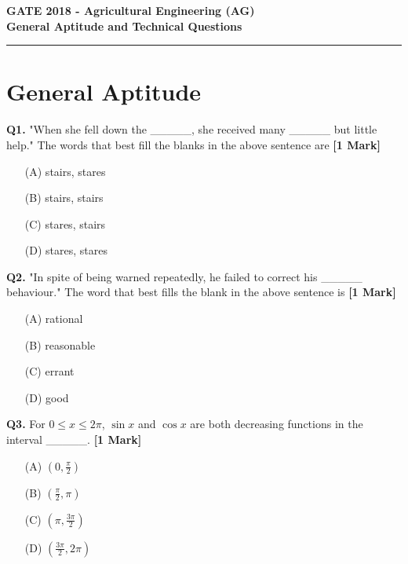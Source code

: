 \documentclass[11pt]{article}
\newcommand{\questiona}[2]{
    \noindent\textbf{Q#2.} #1 \hfill \textbf{[1 Mark]}
}
\begin{document}
\begin{center}
    \Large\textbf{GATE 2018 - Agricultural Engineering (AG)} \\
    \large\textbf{General Aptitude and Technical Questions} \\
    \rule{\textwidth}{0.5pt} %
\end{center}

\vspace{0.5cm}

\section*{General Aptitude}

\questiona{"When she fell down the \_\_\_\_\_, she received many \_\_\_\_\_ but little help." The words that best fill the blanks in the above sentence are}{1}
\begin{enumerate}
    \item[(A)] stairs, stares  
    \item[(B)] stairs, stairs  
    \item[(C)] stares, stairs  
    \item[(D)] stares, stares  
\end{enumerate}
\vspace{0.5cm}

\questiona{"In spite of being warned repeatedly, he failed to correct his \_\_\_\_\_ behaviour." The word that best fills the blank in the above sentence is}{2}
\begin{enumerate}
    \item[(A)] rational  
    \item[(B)] reasonable  
    \item[(C)] errant  
    \item[(D)] good  
\end{enumerate}
\vspace{0.5cm}

\questiona{For \(0 \leq x \leq 2\pi\), \(\sin x\) and \(\cos x\) are both decreasing functions in the interval \_\_\_\_\_.}{3}
\begin{enumerate}
    \item[(A)] \(\left(0, \frac{\pi}{2}\right)\)  
    \item[(B)] \(\left(\frac{\pi}{2}, \pi\right)\)  
    \item[(C)] \(\left(\pi, \frac{3\pi}{2}\right)\)  
    \item[(D)] \(\left(\frac{3\pi}{2}, 2\pi\right)\)  
\end{enumerate}
\vspace{0.5cm}
\end{document}
